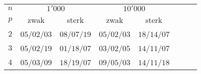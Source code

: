 \begin{tabular}{cccccccc}
\toprule
$n$&\multicolumn{2}{c}{$1'000$}&\multicolumn{2}{c}{$10'000$}\\
$p$&zwak&sterk&zwak&sterk\\\midrule
$2$&$05$/$02$/$03$&$08$/$07$/$19$&$05$/$02$/$03$&$18$/$14$/$07$\\
$3$&$05$/$02$/$19$&$01$/$18$/$07$&$03$/$02$/$05$&$14$/$11$/$07$\\
$4$&$05$/$03$/$09$&$18$/$19$/$07$&$09$/$05$/$03$&$14$/$11$/$18$\\
\bottomrule
\end{tabular}
